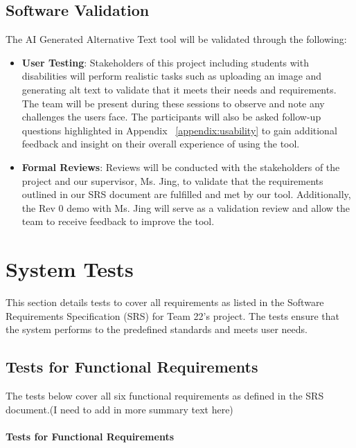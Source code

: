 \documentclass[12pt, titlepage]{article}
\begin{document}
\subsection{Software Validation}
The AI Generated Alternative Text tool will be validated through the following: 
\begin{itemize}
  \item \textbf{User Testing}: Stakeholders of this project including students with disabilities
  will perform realistic tasks such as uploading an image and generating alt text to validate 
  that it meets their needs and requirements. The team will be present during these sessions to observe and note any challenges 
  the users face. The participants will also be asked follow-up questions highlighted in Appendix ~\ref{appendix:usability} to gain additional feedback and insight
  on their overall experience of using the tool. 
  \item \textbf{Formal Reviews}: Reviews will be conducted with the stakeholders of the project and our supervisor, Ms. Jing, to validate that the requirements
  outlined in our SRS document are fulfilled and met by our tool. Additionally, the Rev 0 demo with Ms. Jing will serve as a validation review and allow the team 
  to receive feedback to improve the tool. 
\end{itemize} 

\section{System Tests}
\label{System Tests Desc}



This section details tests to cover all requirements as listed in the
Software Requirements Specification (SRS) for Team 22's project. The
tests ensure that the system performs to the predefined standards and
meets user needs.

\subsection{Tests for Functional Requirements}

The tests below cover all six functional requirements as defined in
the SRS document.(I need to add in more summary text here)

\paragraph{Tests for Functional Requirements}
\end{document}
